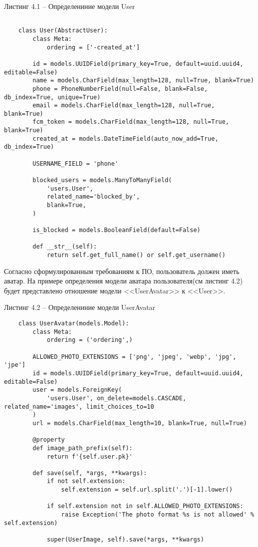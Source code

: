 Листинг 4.1 – Определениние модели User
\begin{lstlisting}

    class User(AbstractUser):
        class Meta:
            ordering = ['-created_at']

        id = models.UUIDField(primary_key=True, default=uuid.uuid4, editable=False)
        name = models.CharField(max_length=128, null=True, blank=True)
        phone = PhoneNumberField(null=False, blank=False, db_index=True, unique=True)
        email = models.CharField(max_length=128, null=True, blank=True)
        fcm_token = models.CharField(max_length=128, null=True, blank=True)
        created_at = models.DateTimeField(auto_now_add=True, db_index=True)

        USERNAME_FIELD = 'phone'

        blocked_users = models.ManyToManyField(
            'users.User',
            related_name='blocked_by',
            blank=True,
        )

        is_blocked = models.BooleanField(default=False)

        def __str__(self):
            return self.get_full_name() or self.get_username()
\end{lstlisting}

Согласно сформулированным требованиям к ПО, пользователь должен иметь аватар.
На примере определения модели аватара пользователя(см листинг 4.2) будет представлено отношение модели <<UserAvatar>> к <<User>>.

\bigskip
\bigskip


Листинг 4.2 – Определениние модели UserAvatar
\begin{lstlisting}
    class UserAvatar(models.Model):
        class Meta:
            ordering = ('ordering',)

        ALLOWED_PHOTO_EXTENSIONS = ['png', 'jpeg', 'webp', 'jpg', 'jpe']
        id = models.UUIDField(primary_key=True, default=uuid.uuid4, editable=False)
        user = models.ForeignKey(
            'users.User', on_delete=models.CASCADE, related_name='images', limit_choices_to=10
        )
        url = models.CharField(max_length=10, blank=True, null=True)

        @property
        def image_path_prefix(self):
            return f'{self.user.pk}'

        def save(self, *args, **kwargs):
            if not self.extension:
                self.extension = self.url.split('.')[-1].lower()

            if self.extension not in self.ALLOWED_PHOTO_EXTENSIONS:
                raise Exception('The photo format %s is not allowed' % self.extension)

            super(UserImage, self).save(*args, **kwargs)

\end{lstlisting}

